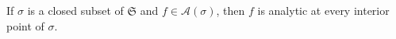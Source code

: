 If $\sigma$ is a closed subset of $\mathfrak{S}$ and $f \in \mathcal{A}(\sigma)$, then $f$ is analytic at every interior point of $\sigma$.
